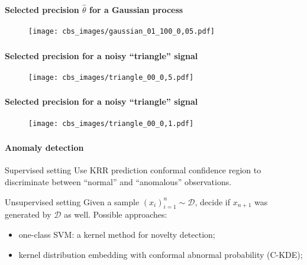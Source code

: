 \documentclass[t]{beamer}  %
\newcommand{\Dcal}{\mathcal{D}}
\begin{document}
\begin{frame}[t]\frametitle{\insertsection}
  \framesubtitle{Selected precision $\hat{\theta}$ for a Gaussian process}
  \begin{figure}%
    \centering
    \texttt{[image: cbs\_images/gaussian\_01\_100\_0,05.pdf]}
  \end{figure}
\end{frame}

\begin{frame}[t]\frametitle{\insertsection}
  \framesubtitle{Selected precision for a noisy ``triangle'' signal}
  \begin{figure}%
    \centering
    \texttt{[image: cbs\_images/triangle\_00\_0,5.pdf]}
  \end{figure}
\end{frame}

\begin{frame}[t]\frametitle{\insertsection}
  \framesubtitle{Selected precision for a noisy ``triangle'' signal}
  \begin{figure}%
    \centering
    \texttt{[image: cbs\_images/triangle\_00\_0,1.pdf]}
  \end{figure}
\end{frame}


\begin{frame}[t]\frametitle{\insertsection}
  \framesubtitle{Anomaly detection}
  \begin{block}{Supervised setting}
    Use KRR prediction conformal confidence region to discriminate between
    ``normal'' and ``anomalous'' observations.
  \end{block}

  \begin{block}{Unsupervised setting}
    Given a sample $(x_i)_{i=1}^n\sim \Dcal$, decide if $x_{n+1}$ was generated
    by $\Dcal$ as well. Possible approaches:
    \begin{itemize}
      \item one-class SVM: a kernel method for novelty detection;
      \item kernel distribution embedding with conformal abnormal probability (C-KDE);
    \end{itemize}
  \end{block}
\end{frame}
\end{document}
